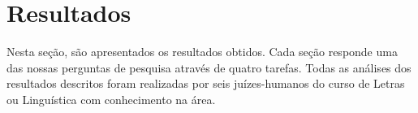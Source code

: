 \section{Resultados}\label{sec-experimentos-resultados}

Nesta seção, são apresentados os resultados obtidos. Cada seção responde uma das nossas perguntas de pesquisa através de quatro tarefas. Todas as análises dos resultados descritos foram realizadas por seis juízes-humanos do curso de Letras ou Linguística com conhecimento na área.













